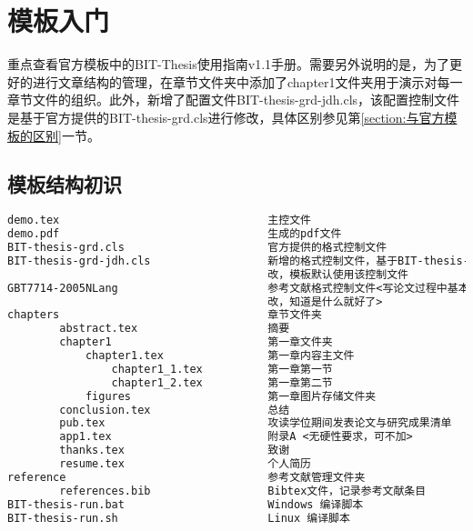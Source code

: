 \chapter{模板入门}
重点查看官方模板中的BIT-Thesis使用指南v1.1手册。需要另外说明的是，为了更好的进行文章结构的管理，在章节文件夹中添加了chapter1文件夹用于演示对每一章节文件的组织。此外，新增了配置文件BIT-thesis-grd-jdh.cls，该配置控制文件是基于官方提供的BIT-thesis-grd.cls进行修改，具体区别参见第\ref{section:与官方模板的区别}一节。
\section{模板结构初识}
\begin{lstlisting}[language={tex}, caption={模板文件布局}]
demo.tex      							主控文件
demo.pdf   								生成的pdf文件
BIT-thesis-grd.cls 						官方提供的格式控制文件
BIT-thesis-grd-jdh.cls  				新增的格式控制文件，基于BIT-thesis-grd.cls修
										改，模板默认使用该控制文件
GBT7714-2005NLang  						参考文献格式控制文件<写论文过程中基本不需要修
										改，知道是什么就好了>
chapters 								章节文件夹
		abstract.tex 					摘要
		chapter1 						第一章文件夹
			chapter1.tex 				第一章内容主文件
				chapter1_1.tex 			第一章第一节
				chapter1_2.tex 			第一章第二节
			figures 					第一章图片存储文件夹
		conclusion.tex 					总结
		pub.tex 						攻读学位期间发表论文与研究成果清单
		app1.tex						附录A <无硬性要求，可不加>
		thanks.tex 						致谢
		resume.tex 						个人简历
reference								参考文献管理文件夹
		references.bib 					Bibtex文件，记录参考文献条目
BIT-thesis-run.bat 						Windows 编译脚本
BIT-thesis-run.sh 						Linux 编译脚本
\end{lstlisting}
